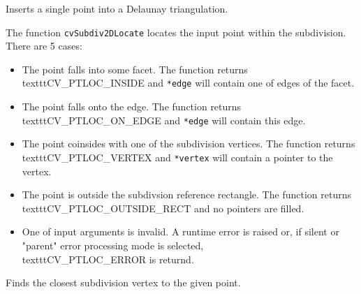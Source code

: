 \label{Subdiv2DLocate}

Inserts a single point into a Delaunay triangulation.


\begin{description}
\end{description}

The function \texttt{cvSubdiv2DLocate} locates the input point within the subdivision. There are 5 cases:

\begin{itemize}
 \item The point falls into some facet. The function returns \\texttt{CV\_PTLOC\_INSIDE} and \texttt{*edge} will contain one of edges of the facet.
 \item The point falls onto the edge. The function returns \\texttt{CV\_PTLOC\_ON\_EDGE} and \texttt{*edge} will contain this edge.
 \item The point coinsides with one of the subdivision vertices. The function returns \\texttt{CV\_PTLOC\_VERTEX} and \texttt{*vertex} will contain a pointer to the vertex.
 \item The point is outside the subdivsion reference rectangle. The function returns \\texttt{CV\_PTLOC\_OUTSIDE\_RECT} and no pointers are filled.
 \item One of input arguments is invalid. A runtime error is raised or, if silent or "parent" error processing mode is selected, \\texttt{CV\_PTLOC\_ERROR} is returnd.
\end{itemize}

\label{FindNearestPoint2D}

Finds the closest subdivision vertex to the given point.


